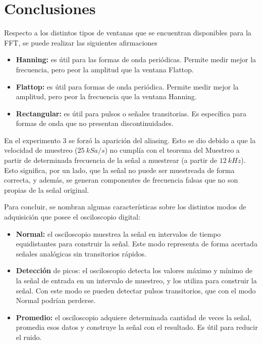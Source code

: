   \pagebreak
  \section{Conclusiones}


  Respecto a los distintos tipos de ventanas que se encuentran disponibles para la FFT, se puede realizar
  las siguientes afirmaciones

  \begin{itemize}
    \item \textbf{Hanning:} es útil para las formas de onda periódicas. Permite medir mejor la frecuencia, pero peor
      la amplitud que la ventana Flattop.
    \item \textbf{Flattop:} es útil para formas de onda periódica. Permite medir mejor la amplitud, pero peor
      la frecuencia que la ventana Hanning.
    \item \textbf{Rectangular:} es útil para pulsos o señales transitorias. Es específica para formas de onda
      que no presentan discontinuidades.
  \end{itemize}

  En el experimento 3 se forzó la aparición del aliasing. Esto se dio debido a que la velocidad de muestreo ($25~kSa/s$)
  no cumplía con el teorema del Muestreo a partir de determinada frecuencia de la señal a muestrear (a partir de $12~kHz$).
  Esto significa, por un lado, que la señal no puede ser muestreada de forma correcta, y además, se generan componentes
  de frecuencia falsas que no son propias de la señal original.

  Para concluir, se nombran algunas características sobre los distintos modos de adquisición que posee el osciloscopio
  digital:

  \begin{itemize}
    \item \textbf{Normal:} el osciloscopio muestrea la señal en intervalos de tiempo equidistantes para construir la señal. Este
      modo representa de forma acertada señales analógicas sin transitorios rápidos.
    \item \textbf{Detección} de picos: el osciloscopio detecta los valores máximo y mínimo de la señal de entrada en un intervalo
      de muestreo, y los utiliza para construir la señal. Con este modo se pueden detectar pulsos transitorios, que con el
      modo Normal podrían perderse.
    \item \textbf{Promedio:} el osciloscopio adquiere determinada cantidad de veces la señal, promedia esos datos y construye la
      señal con el resultado. Es útil para reducir el ruido.
  \end{itemize}

